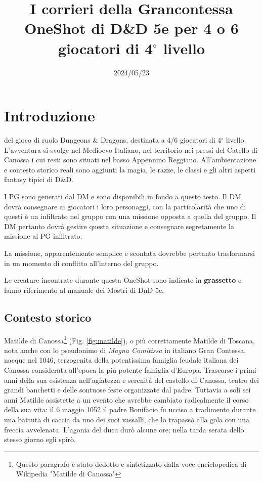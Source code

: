 \documentclass[letterpaper,twocolumn,openany,nodeprecatedcode]{dndbook}
\title{I corrieri della Grancontessa \\
\large OneShot di D\&D 5e per 4 o 6 giocatori di 4$^\circ$ livello}
\author{}
\date{2024/05/23}
\begin{document}
\frontmatter

\maketitle

\tableofcontents


\mainmatter%





\chapter{Introduzione}

 del gioco di ruolo Dungeons \& Dragons\cite{dnd:giocatore}, destinata a 4/6 giocatori di 4$^\circ$ livello. L'avventura si svolge nel Medioevo Italiano, nel territorio nei pressi del Catello di Canossa i cui resti sono situati nel basso Appennino Reggiano. All'ambientazione e contesto storico reali sono aggiunti la magia, le razze, le classi e gli altri aspetti fantasy tipici di D\&D.

I PG sono generati dal DM e sono disponibili in fondo a questo testo. Il DM dovrà consegnare ai giocatori i loro personaggi, con la particolarità che uno di questi è un infiltrato nel gruppo con una missione opposta a quella del gruppo. Il DM pertanto dovrà gestire questa situazione e consegnare segretamente la missione al PG infiltrato.

La missione, apparentemente semplice e scontata dovrebbe pertanto trasformarsi in un momento di conflitto all'interno del gruppo.

Le creature incontrate durante questa OneShot sono indicate in \textbf{grassetto} e fanno riferimento al manuale dei Mostri di DnD 5e\cite{dnd:mostri}.

\section{Contesto storico}


Matilde di Canossa\footnote{Questo paragrafo è stato dedotto e sintetizzato dalla voce enciclopedica di Wikipedia "Matilde di Canossa"} (Fig. \ref{fig:matilde})\cite{wiki:matilde}, o più correttamente Matilde di Toscana, nota anche con lo pseudonimo di \textit{Magna Comitissa} in italiano Gran Contessa, nacque nel 1046, terzogenita della potentissima famiglia feudale italiana dei Canossa considerata all'epoca la più potente famiglia d'Europa. Trascorse i primi anni della sua esistenza nell'agiatezza e serenità del castello di Canossa, teatro dei grandi banchetti e delle sontuose feste organizzate dal padre. Tuttavia a soli sei anni Matilde assistette a un evento che avrebbe cambiato radicalmente il corso della sua vita: il 6 maggio 1052 il padre Bonifacio fu ucciso a tradimento durante una battuta di caccia da uno dei suoi vassalli, che lo trapassò alla gola con una freccia avvelenata. L'agonia del duca durò alcune ore; nella tarda serata dello stesso giorno egli spirò.
\end{document}
